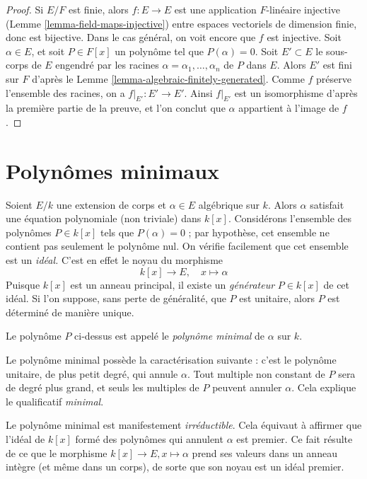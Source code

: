 \begin{proof}
Si $E/F$ est finie, alors $f : E \to E$ est une application $F$-linéaire
injective (Lemme \ref{lemma-field-maps-injective})
entre espaces vectoriels de dimension finie, donc est bijective.
Dans le cas général, on voit encore que $f$ est injective.
Soit $\alpha \in E$, et soit $P \in F[x]$ un
polynôme tel que $P(\alpha) = 0$.
Soit $E' \subset E$ le sous-corps de $E$ engendré
par les racines $\alpha = \alpha_1, \ldots, \alpha_n$ de $P$ dans $E$.
Alors $E'$ est fini sur $F$ d'après le Lemme \ref{lemma-algebraic-finitely-generated}.
Comme $f$ préserve l'ensemble des racines, on a
$f|_{E'} : E' \to E'$. Ainsi $f|_{E'}$ est un isomorphisme
d'après la première partie de la preuve, et l'on conclut que $\alpha$
appartient à l'image de $f$.
\end{proof}








\section{Polynômes minimaux}
\label{section-minimal-polynomials}

\noindent
Soient $E/k$ une extension de corps et $\alpha \in E$ algébrique sur $k$.
Alors $\alpha$ satisfait une équation polynomiale (non triviale) dans $k[x]$.
Considérons l'ensemble des polynômes $P \in k[x]$ tels que $P(\alpha) = 0$ ; par
hypothèse, cet ensemble ne contient pas seulement le polynôme nul.
On vérifie facilement que cet ensemble est un {\it idéal.} C'est en effet le noyau
du morphisme
$$
k[x] \to E, \quad x \mapsto \alpha
$$
Puisque $k[x]$ est un anneau principal, il existe un {\it générateur} $P \in k[x]$ de cet
idéal. Si l'on suppose, sans perte de généralité, que $P$ est unitaire, alors $P$ est
déterminé de manière unique.

\begin{definition}
\label{definition-minimal-polynomial}
Le polynôme $P$ ci-dessus est appelé le {\it polynôme minimal}
de $\alpha$ sur $k$.
\end{definition}

\noindent
Le polynôme minimal possède la caractérisation suivante : c'est le polynôme unitaire,
de plus petit degré, qui annule $\alpha$. Tout multiple non constant de $P$
sera de degré plus grand, et seuls les multiples de $P$ peuvent
annuler $\alpha$. Cela explique le qualificatif {\it minimal}.

\medskip\noindent
Le polynôme minimal est manifestement {\it irréductible}. Cela équivaut à affirmer
que l'idéal de $k[x]$ formé des polynômes qui annulent
$\alpha$ est premier. Ce fait résulte de ce que le morphisme
$k[x] \to E, x \mapsto \alpha$ prend ses valeurs dans un anneau intègre (et même dans un corps), de sorte que son
noyau est un idéal premier.

